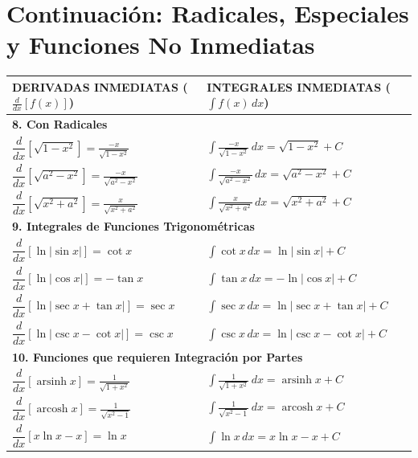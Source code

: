\documentclass{article}
\DeclareMathOperator{\arsinh}{arsinh}
\DeclareMathOperator{\arcosh}{arcosh}
\newcommand{\deriv}[2]{\frac{d#1}{d#2}}
\newcommand{\integral}[2]{\int #1 \, d#2}
\newcommand{\tablerowcolors}{\rowcolors{2}{gray!10}{white}}
\begin{document}
\newpage

\section{Continuación: Radicales, Especiales y Funciones No Inmediatas}
\label{sec:tabla_paralela_continuacion}

\begin{center}
\footnotesize
\setlength{\tabcolsep}{6pt}
\tablerowcolors
\begin{tabular}{p{}p{}}
\toprule
\textbf{DERIVADAS INMEDIATAS} ($\deriv{}{x}[f(x)]$) & \textbf{INTEGRALES INMEDIATAS} ($\integral{f(x)}{x}$) \\
\midrule
\multicolumn{2}{l}{\textbf{8. Con Radicales}} \\
\midrule
$\dfrac{d}{dx}[\sqrt{1-x^2}] = \frac{-x}{\sqrt{1-x^2}}$ & $\displaystyle\int \frac{-x}{\sqrt{1-x^2}} \, dx = \sqrt{1-x^2} + C$ \\
$\dfrac{d}{dx}[\sqrt{a^2-x^2}] = \frac{-x}{\sqrt{a^2-x^2}}$ & $\displaystyle\int \frac{-x}{\sqrt{a^2-x^2}} \, dx = \sqrt{a^2-x^2} + C$ \\
$\dfrac{d}{dx}[\sqrt{x^2+a^2}] = \frac{x}{\sqrt{x^2+a^2}}$ & $\displaystyle\int \frac{x}{\sqrt{x^2+a^2}} \, dx = \sqrt{x^2+a^2} + C$ \\
\midrule
\multicolumn{2}{l}{\textbf{9. Integrales de Funciones Trigonométricas}} \\
\midrule
$\dfrac{d}{dx}[\ln|\sin x|] = \cot x$ & $\displaystyle\int \cot x \, dx = \ln|\sin x| + C$ \\
$\dfrac{d}{dx}[\ln|\cos x|] = -\tan x$ & $\displaystyle\int \tan x \, dx = -\ln|\cos x| + C$ \\
$\dfrac{d}{dx}[\ln|\sec x+\tan x|] = \sec x$ & $\displaystyle\int \sec x \, dx = \ln|\sec x+\tan x| + C$ \\
$\dfrac{d}{dx}[\ln|\csc x-\cot x|] = \csc x$ & $\displaystyle\int \csc x \, dx = \ln|\csc x-\cot x| + C$ \\
\midrule
\multicolumn{2}{l}{\textbf{10. Funciones que requieren Integración por Partes}} \\
\midrule
$\dfrac{d}{dx}[\arsinh x] = \frac{1}{\sqrt{1+x^2}}$ & $\displaystyle\int \frac{1}{\sqrt{1+x^2}} \, dx = \arsinh x + C$ \\
$\dfrac{d}{dx}[\arcosh x] = \frac{1}{\sqrt{x^2-1}}$ & $\displaystyle\int \frac{1}{\sqrt{x^2-1}} \, dx = \arcosh x + C$ \\
$\dfrac{d}{dx}[x\ln x - x] = \ln x$ & $\displaystyle\int \ln x \, dx = x\ln x - x + C$ \\

\end{tabular}
\end{center}
\end{document}

